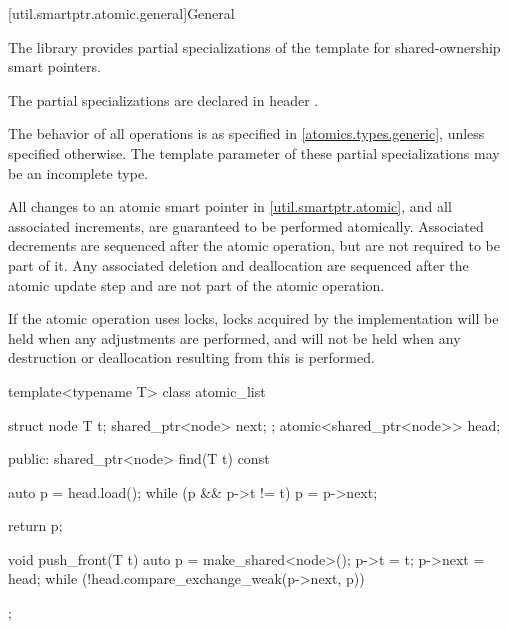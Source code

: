 [util.smartptr.atomic.general]{General}

\pnum
The library provides partial specializations of the  template
for shared-ownership smart pointers.
\begin{note}
The partial specializations are declared in header .
\end{note}
The behavior of all operations is as specified in \ref{atomics.types.generic},
unless specified otherwise.
The template parameter  of these partial specializations
may be an incomplete type.

\pnum
All changes to an atomic smart pointer in \ref{util.smartptr.atomic}, and
all associated  increments,
are guaranteed to be performed atomically.
Associated  decrements
are sequenced after the atomic operation,
but are not required to be part of it.
Any associated deletion and deallocation
are sequenced after the atomic update step and
are not part of the atomic operation.
\begin{note}
If the atomic operation uses locks,
locks acquired by the implementation
will be held when any  adjustments are performed, and
will not be held when any destruction or deallocation
resulting from this is performed.
\end{note}

\pnum
\begin{example}
\begin{codeblock}
template<typename T> class atomic_list {
  struct node {
    T t;
    shared_ptr<node> next;
  };
  atomic<shared_ptr<node>> head;

public:
  shared_ptr<node> find(T t) const {
    auto p = head.load();
    while (p && p->t != t)
      p = p->next;

    return p;
  }

  void push_front(T t) {
    auto p = make_shared<node>();
    p->t = t;
    p->next = head;
    while (!head.compare_exchange_weak(p->next, p)) {}
  }
};
\end{codeblock}
\end{example}

